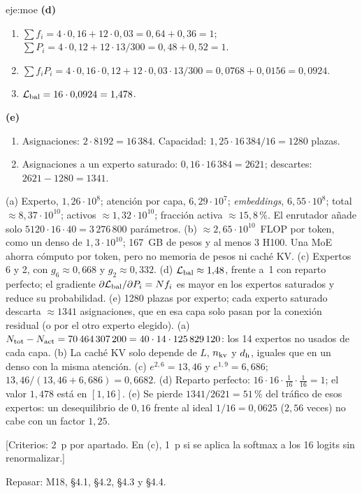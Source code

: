 \begin{solucion}{eje:moe}
\noindent\textbf{(d)}
\begin{enumerate}[label=\arabic*.]
  \item $\sum f_i=4\cdot 0{,}16+12\cdot 0{,}03=0{,}64+0{,}36=1$; $\sum P_i=4\cdot 0{,}12+12\cdot 13/300=0{,}48+0{,}52=1$.
  \item $\sum f_iP_i=4\cdot 0{,}16\cdot 0{,}12+12\cdot 0{,}03\cdot 13/300=0{,}0768+0{,}0156=0{,}0924$.
  \item $\mathcal{L}_{\mathrm{bal}}=16\cdot 0{,}0924=1{,}478$.
\end{enumerate}

\noindent\textbf{(e)}
\begin{enumerate}[label=\arabic*.]
  \item Asignaciones: $2\cdot 8192=16\,384$. Capacidad: $1{,}25\cdot 16\,384/16=1280$ plazas.
  \item Asignaciones a un experto saturado: $0{,}16\cdot 16\,384=2621$; descartes: $2621-1280=1341$.
\end{enumerate}
\resultado (a) Experto, $1{,}26\cdot 10^{8}$; atención por capa, $6{,}29\cdot 10^{7}$; \emph{embeddings}, $6{,}55\cdot 10^{8}$; total $\approx 8{,}37\cdot 10^{10}$; activos $\approx 1{,}32\cdot 10^{10}$; fracción activa $\approx 15{,}8\,\%$. El enrutador añade solo $5120\cdot 16\cdot 40=3\,276\,800$ parámetros. (b) $\approx 2{,}65\cdot 10^{10}$~FLOP por token, como un denso de $1{,}3\cdot 10^{10}$; 167~GB de pesos y al menos 3 H100. Una MoE ahorra cómputo por token, pero no memoria de pesos ni caché KV. (c) Expertos 6 y 2, con $g_6\approx 0{,}668$ y $g_2\approx 0{,}332$. (d) $\mathcal{L}_{\mathrm{bal}}\approx 1{,}48$, frente a~1 con reparto perfecto; el gradiente $\partial\mathcal{L}_{\mathrm{bal}}/\partial P_i=Nf_i$ es mayor en los expertos saturados y reduce su probabilidad. (e) 1280 plazas por experto; cada experto saturado descarta $\approx 1341$ asignaciones, que en esa capa solo pasan por la conexión residual (o por el otro experto elegido).
\comprobacion (a) $N_{\mathrm{tot}}-N_{\mathrm{act}}=70\,464\,307\,200=40\cdot 14\cdot 125\,829\,120$: los 14 expertos no usados de cada capa. (b) La caché KV solo depende de $L$, $n_{\mathrm{kv}}$ y $d_{\mathrm{h}}$, iguales que en un denso con la misma atención. (c) $e^{2{,}6}=13{,}46$ y $e^{1{,}9}=6{,}686$; $13{,}46/(13{,}46+6{,}686)=0{,}6682$. (d) Reparto perfecto: $16\cdot 16\cdot\frac{1}{16}\cdot\frac{1}{16}=1$; el valor $1{,}478$ está en $[1,16]$. (e) Se pierde $1341/2621=51\,\%$ del tráfico de esos expertos: un desequilibrio de $0{,}16$ frente al ideal $1/16=0{,}0625$ ($2{,}56$ veces) no cabe con un factor $1{,}25$.

[Criterios: 2~p por apartado. En (c), 1~p si se aplica la softmax a los 16 logits sin renormalizar.]

Repasar: M18, §4.1, §4.2, §4.3 y §4.4.
\end{solucion}

